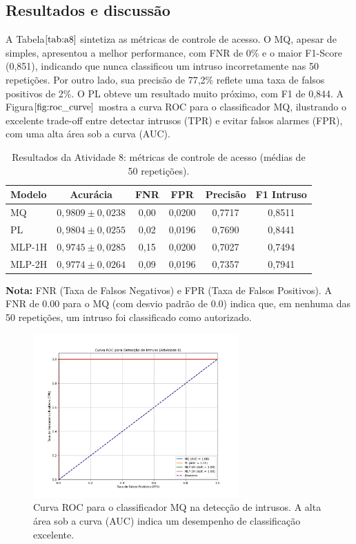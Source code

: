 \documentclass[11pt,a4paper]{article}
\begin{document}
\subsection{Resultados e discussão}

A Tabela\(\ref{tab:a8}\) sintetiza as métricas de controle de acesso. O MQ, apesar de simples, apresentou a melhor performance, com FNR de 0\% e o maior F1-Score (0,851), indicando que nunca classificou um intruso incorretamente nas 50 repetições. Por outro lado, sua precisão de 77,2\% reflete uma taxa de falsos positivos de 2\%. O PL obteve um resultado muito próximo, com F1 de 0,844. A Figura\(\ref{fig:roc_curve}\) mostra a curva ROC para o classificador MQ, ilustrando o excelente trade-off entre detectar intrusos (TPR) e evitar falsos alarmes (FPR), com uma alta área sob a curva (AUC).

\begin{table}[h!]
  \centering
  \caption{Resultados da Atividade 8: métricas de controle de acesso (médias de 50 repetições).}
  \label{tab:a8}
  \begin{tabular}{@{}lccccc@{}}
    \toprule
    \textbf{Modelo} & \textbf{Acurácia} & \textbf{FNR} & \textbf{FPR} & \textbf{Precisão} & \textbf{F1 Intruso} \\
    \midrule
    MQ & \(0,9809 \pm 0,0238\) & 0,00 & 0,0200 & 0,7717 & 0,8511 \\
    PL & \(0,9804 \pm 0,0255\) & 0,02 & 0,0196 & 0,7690 & 0,8441 \\
    MLP-1H & \(0,9745 \pm 0,0285\) & 0,15 & 0,0200 & 0,7027 & 0,7494 \\
    MLP-2H & \(0,9774 \pm 0,0264\) & 0,09 & 0,0196 & 0,7357 & 0,7941 \\
    \bottomrule
  \end{tabular}
\end{table}

\noindent\footnotesize{\textbf{Nota:} FNR (Taxa de Falsos Negativos) e FPR (Taxa de Falsos Positivos). A FNR de 0.00 para o MQ (com desvio padrão de 0.0) indica que, em nenhuma das 50 repetições, um intruso foi classificado como autorizado.}

\begin{figure}[h!]
  \centering
  \includegraphics[width=0.7\textwidth]{results/TC2/roc_curve_A8.png}
  \caption{Curva ROC para o classificador MQ na detecção de intrusos. A alta área sob a curva (AUC) indica um desempenho de classificação excelente.}
  \label{fig:roc_curve}
\end{figure}
\end{document}
